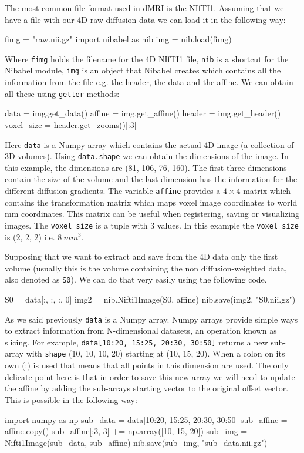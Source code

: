 \documentclass{bioinfo}
\begin{document}
The most common file format used in dMRI is the NIfTI1. Assuming that we have a
file with our 4D raw diffusion data we can load it in the following way:
\begin{python}
fimg = "raw.nii.gz"
import nibabel as nib
img = nib.load(fimg)
\end{python}
Where \texttt{fimg} holds the filename for the 4D NIfTI1 file, \texttt{nib} is
a shortcut for the Nibabel module, \texttt{img} is an object that Nibabel
creates which contains all the information from the file e.g. the header, the
data and the affine. We can obtain all these using \texttt{getter} methods:
\begin{python}
data = img.get_data()
affine = img.get_affine()
header = img.get_header()
voxel_size = header.get_zooms()[:3]
\end{python}
Here \texttt{data} is a Numpy array which contains the actual 4D image (a
collection of 3D volumes). Using \texttt{data.shape} we can obtain the
dimensions of the image. In this example, the dimensions are (81, 106, 76,
160). The first three dimensions contain the size of the volume and the last
dimension has the information for the different diffusion gradients. The
variable \texttt{affine} provides a $4\times4$ matrix which contains the
transformation matrix which maps voxel image coordinates to world mm
coordinates. This matrix can be useful when registering, saving or visualizing
images. The \texttt{voxel\_size} is a tuple with 3 values. In this example the
\texttt{voxel\_size} is (2, 2, 2) i.e. $8~mm^3$.

Supposing that we want to extract and save from the 4D data only the first
volume (usually this is the volume containing the non diffusion-weighted data,
also denoted as \texttt{S0}). We can do that very easily using the following code.
\begin{python}
S0 = data[:, :, :, 0]
img2 = nib.Nifti1Image(S0, affine)
nib.save(img2, "S0.nii.gz")
\end{python}
As we said previously \texttt{data} is a Numpy array. Numpy arrays provide
simple ways to extract information from N-dimensional datasets, an operation
known as slicing. For example, \texttt{data[10:20, 15:25, 20:30, 30:50]}
returns a new sub-array with \texttt{shape} (10, 10, 10, 20) starting at (10, 15, 20). When a
colon on its own (:) is used that means that all points in this dimension are used. The
only delicate point here is that in order to save this new array we will need
to update the affine by adding the sub-arrays starting vector to the original offset vector. This is possible in the following way:
\begin{python}
import numpy as np
sub_data = data[10:20, 15:25, 20:30, 30:50]
sub_affine = affine.copy()
sub_affine[:3, 3] += np.array([10, 15, 20])
sub_img = Nifti1Image(sub_data, sub_affine)
nib.save(sub_img, "sub_data.nii.gz")
\end{python}
\end{document}
